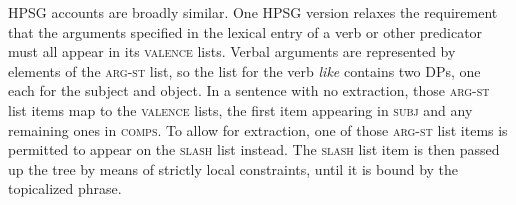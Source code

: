 \begin{exe}
  \label{tree5}
\ex{}
		
\ex \label{ann} 
{
}
\end{exe}

\noindent
HPSG accounts are broadly similar.  One HPSG version relaxes the requirement that the arguments specified in the lexical entry of a verb or other predicator must all appear in its \textsc{valence} lists.   Verbal arguments are represented by elements of the \textsc{arg-st} list, so the list for the verb \textit{like} contains two DPs, one each for the subject and object.  In a sentence with no extraction, those \textsc{arg-st} list items map to the \textsc{valence} lists, the  first item appearing in \textsc{subj} and any remaining ones in \textsc{comps}.  To allow for extraction, one of those \textsc{arg-st} list items is permitted to appear on the \textsc{slash} list instead.  The \textsc{slash} list item is then passed up the tree by means of strictly local constraints, until it is bound by the topicalized phrase.   

